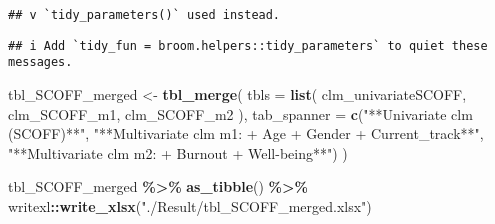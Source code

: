 \documentclass[
]{article}
\newenvironment{Shaded}{\begin{snugshade}}{\end{snugshade}}
\newcommand{\AttributeTok}[1]{\textcolor[rgb]{0.13,0.29,0.53}{#1}}
\newcommand{\FunctionTok}[1]{\textcolor[rgb]{0.13,0.29,0.53}{\textbf{#1}}}
\newcommand{\NormalTok}[1]{#1}
\newcommand{\OtherTok}[1]{\textcolor[rgb]{0.56,0.35,0.01}{#1}}
\newcommand{\SpecialCharTok}[1]{\textcolor[rgb]{0.81,0.36,0.00}{\textbf{#1}}}
\newcommand{\StringTok}[1]{\textcolor[rgb]{0.31,0.60,0.02}{#1}}
\begin{document}
\begin{verbatim}
## v `tidy_parameters()` used instead.
\end{verbatim}

\begin{verbatim}
## i Add `tidy_fun = broom.helpers::tidy_parameters` to quiet these messages.
\end{verbatim}

\begin{Shaded}
\begin{Highlighting}[]
\NormalTok{tbl\_SCOFF\_merged }\OtherTok{\textless{}{-}}
  \FunctionTok{tbl\_merge}\NormalTok{(}
  \AttributeTok{tbls =} \FunctionTok{list}\NormalTok{(}
\NormalTok{    clm\_univariateSCOFF,}
\NormalTok{    clm\_SCOFF\_m1,}
\NormalTok{    clm\_SCOFF\_m2}
\NormalTok{  ),}
  \AttributeTok{tab\_spanner =} \FunctionTok{c}\NormalTok{(}\StringTok{"**Univariate clm (SCOFF)**"}\NormalTok{,}
                  \StringTok{"**Multivariate clm m1: + Age + Gender + Current\_track**"}\NormalTok{,}
                  \StringTok{"**Multivariate clm m2: + Burnout + Well{-}being**"}\NormalTok{)}
\NormalTok{)}

\NormalTok{tbl\_SCOFF\_merged }\SpecialCharTok{\%\textgreater{}\%}
  \FunctionTok{as\_tibble}\NormalTok{() }\SpecialCharTok{\%\textgreater{}\%}
\NormalTok{  writexl}\SpecialCharTok{::}\FunctionTok{write\_xlsx}\NormalTok{(}\StringTok{"./Result/tbl\_SCOFF\_merged.xlsx"}\NormalTok{)}
\end{Highlighting}
\end{Shaded}
\end{document}
